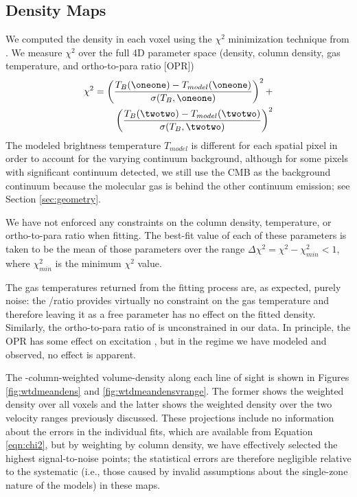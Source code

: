 \subsection{Density Maps}
\label{sec:densmaps}
We computed the density in each voxel using the $\chi^2$ minimization technique
from \citet{Ginsburg2011a}.  We measure $\chi^2$ over the full 4D parameter
space (density, column density, gas temperature,
and ortho-to-para ratio [OPR])
\begin{equation}
    \begin{split}
    \label{eqn:chi2}
    \chi^2 =  \left( \frac{T_B(\oneone)-T_{model}(\oneone)}{\sigma(T_B,\oneone)}\right)^2 +\\
              \left( \frac{T_B(\twotwo)-T_{model}(\twotwo)}{\sigma(T_B,\twotwo)}\right)^2
    \end{split}
\end{equation}
The modeled brightness temperature $T_{model}$ is different for each spatial
pixel in order to account for the varying continuum background, although for
some pixels with significant
continuum detected, we still use the CMB as the background continuum because
the molecular gas is behind the other continuum emission; see Section
\ref{sec:geometry}.

We have not enforced any constraints on the column density,
temperature, or ortho-to-para ratio when fitting.  The best-fit value of each
of these parameters is taken to be the mean of those parameters over the range
$\Delta \chi^2 = \chi^2 - \chi^2_{min} < 1$, where $\chi^2_{min}$ is the
minimum $\chi^2$ value.

The gas temperatures returned from the fitting process are, as expected, purely
noise: the \formaldehyde \oneone/\twotwo ratio provides virtually no constraint
on the gas temperature and therefore leaving it as a free parameter has no
effect on the fitted density.  Similarly, the ortho-to-para ratio of \hh is
unconstrained in our data.  In principle, the \hh OPR has some effect on
\formaldehyde excitation \citep{Troscompt2009a}, but in the regime we have
modeled and observed, no effect is apparent.


The \ortho-column-weighted volume-density along each line of sight is shown in
Figures \ref{fig:wtdmeandens} and \ref{fig:wtdmeandensvrange}.  The former
shows the weighted density over all voxels and the latter shows the weighted
density over the two velocity ranges previously discussed.  These projections
include no information about the errors in the individual fits, which are
available from Equation \ref{eqn:chi2}, but by weighting by column density, we
have effectively selected the highest signal-to-noise points; the statistical
errors are therefore negligible relative to the systematic (i.e., those caused
by invalid assumptions about the single-zone nature of the models) in these
maps.



